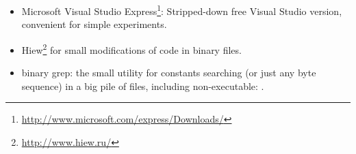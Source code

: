 \begin{itemize}
\item
Microsoft Visual Studio Express\footnote{\url{http://www.microsoft.com/express/Downloads/}}:
{Stripped-down free Visual Studio version, convenient for simple experiments}.

\item
\label{Hiew}
Hiew\footnote{\url{http://www.hiew.ru/}} 
{for small modifications of code in binary files}.

\item
{}
binary grep: 
{the small utility for constants searching (or just any byte sequence) in a big pile of files, 
including non-executable: \BGREPURL.}
\end{itemize}

